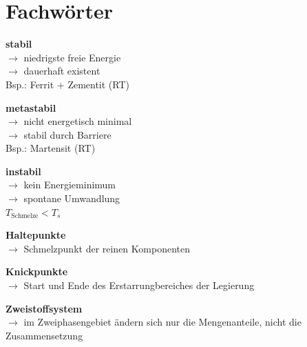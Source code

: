\documentclass[8.5pt,twocolumn]{extarticle}
\begin{document}
    \section{Fachwörter}
    \begin{minipage}[t]{0.32\columnwidth}
        \textbf{stabil}\\
        $\rightarrow$ niedrigste freie Energie\\
        $\rightarrow$ dauerhaft existent\\
        Bsp.: Ferrit + Zementit (RT)
    \end{minipage}\hfill
    \begin{minipage}[t]{0.32\columnwidth}
        \textbf{metastabil}\\
        $\rightarrow$ nicht energetisch minimal\\
        $\rightarrow$ stabil durch Barriere\\
        Bsp.: Martensit (RT)
    \end{minipage}\hfill
    \begin{minipage}[t]{0.32\columnwidth}
        \textbf{instabil}\\
        $\rightarrow$ kein Energieminimum\\
        $\rightarrow$ spontane Umwandlung\\
        $T_\text{Schmelze}<T_s$
    \end{minipage}
    \begin{minipage}[t]{0.32\columnwidth}
        \textbf{Haltepunkte}\\
        $\rightarrow$ Schmelzpunkt der reinen Komponenten\\
    \end{minipage}\hfill
    \begin{minipage}[t]{0.32\columnwidth}
        \textbf{Knickpunkte}\\
        $\rightarrow$ Start und Ende des Erstarrungbereiches der Legierung\\
    \end{minipage}\hfill
    \begin{minipage}[t]{0.32\columnwidth}
        \textbf{Zweistoffsystem}\\
        $\rightarrow$ im Zweiphasengebiet ändern sich nur die
        Mengenanteile, nicht die Zusammensetzung
    \end{minipage}
    
\end{document}
